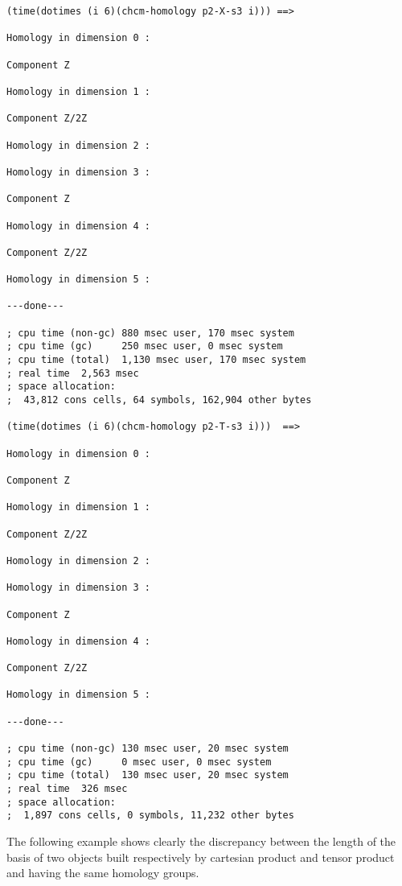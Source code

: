 {\footnotesize\begin{verbatim}
(time(dotimes (i 6)(chcm-homology p2-X-s3 i))) ==>

Homology in dimension 0 :

Component Z

Homology in dimension 1 :

Component Z/2Z

Homology in dimension 2 :

Homology in dimension 3 :

Component Z

Homology in dimension 4 :

Component Z/2Z

Homology in dimension 5 :

---done---

; cpu time (non-gc) 880 msec user, 170 msec system
; cpu time (gc)     250 msec user, 0 msec system
; cpu time (total)  1,130 msec user, 170 msec system
; real time  2,563 msec
; space allocation:
;  43,812 cons cells, 64 symbols, 162,904 other bytes

(time(dotimes (i 6)(chcm-homology p2-T-s3 i)))  ==>

Homology in dimension 0 :

Component Z

Homology in dimension 1 :

Component Z/2Z

Homology in dimension 2 :

Homology in dimension 3 :

Component Z

Homology in dimension 4 :

Component Z/2Z

Homology in dimension 5 :

---done---

; cpu time (non-gc) 130 msec user, 20 msec system
; cpu time (gc)     0 msec user, 0 msec system
; cpu time (total)  130 msec user, 20 msec system
; real time  326 msec
; space allocation:
;  1,897 cons cells, 0 symbols, 11,232 other bytes
\end{verbatim}}
The following example shows clearly the discrepancy between the length of
the basis of two  objects built respectively by cartesian product and tensor product and
having the same homology groups.
